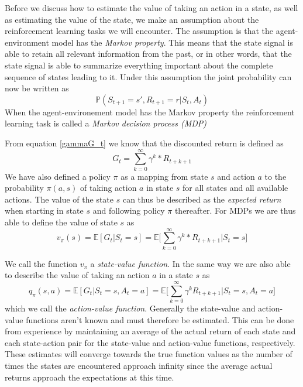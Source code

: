 \documentclass[11pt]{article}
\begin{document}
Before we discuss how to estimate the value of taking an action in a state, as
well as estimating the value of the state, we make an assumption about the reinforcement
learning tasks we will encounter.
The assumption is that the agent-environment model has the \textit{Markov property}.
This means that the state signal is able to retain all relevant information
from the past, or in other words, that the state signal is able to summarize
everything important about the complete sequence of states leading to it.
Under this assumption the joint probability can now be written as
\begin{equation}
    \mathds{P}(S_{t+1} = s', R_{t+1} = r | S_t, A_t)
\end{equation}
When the agent-environement model has the Markov property the reinforcement
learning task is called a \textit{Markov decision process (MDP)}

From equation \ref{gammaG_t} we know that the discounted return
is defined as 
\begin{equation}
    G_t = \sum\limits_{k=0}^\infty \gamma^k * R_{t+k+1}
\end{equation}
We have also defined a policy $\pi$ as a mapping from state $s$ and action $a$
to the probability $\pi(a, s)$ of taking action $a$ in state $s$ for all states
and all available actions.
The value of the state $s$ can thus be described as the \textit{expected return}
when starting in state $s$ and following policy $\pi$ thereafter\cite{RLbook}.
For MDPs we are thus able to define the value of state $s$ as
\begin{equation}\label{eq:sv}
    v_\pi(s) = \mathds{E}[G_t | S_t = s] = \mathds{E}\bigg[\sum\limits_{k=0}^\infty \gamma^k * R_{t+k+1} \bigg| S_t = s\bigg]
\end{equation}

We call the function $v_\pi$ a \textit{state-value function}.
In the same way we are also able to describe the value of taking an action $a$ in a state $s$  as
\begin{equation}\label{eq:av}
    q_{\pi}(s, a) = \mathds{E}[G_{t} | S_{t} = s, A_{t} = a] = \mathds{E}\bigg[\sum_{k = 0}^{\infty} \gamma^{k} R_{t + k + 1} \bigg| S_{t} = s, A_{t} = a \bigg]
\end{equation}
which we call the \textit{action-value function}.
Generally the state-value and action-value functions aren't known and must therefore be
estimated.
This can be done from experience by maintaining an average of the actual return of each
state and each state-action pair for the state-value and action-value
functions, respectively.
These estimates will converge towards the true function values as the number of times
the states are encountered approach infinity since the average actual returns approach
the expectations at this time.
\end{document}
